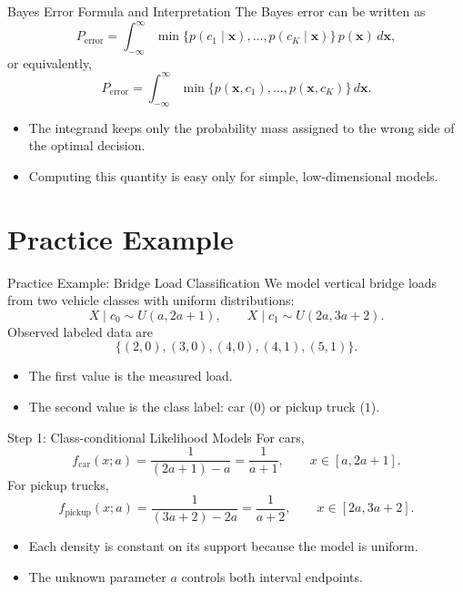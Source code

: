 \documentclass[10pt]{beamer}
\begin{document}
\begin{frame}{Bayes Error Formula and Interpretation}
  \justifying
  The Bayes error can be written as
  \[
    P_{\text{error}} = \int_{-\infty}^{\infty} \min\{p(c_1\mid\bm{x}),\ldots,p(c_K\mid\bm{x})\}\,p(\bm{x})\,d\bm{x},
  \]
  or equivalently,
  \[
    P_{\text{error}} = \int_{-\infty}^{\infty} \min\{p(\bm{x},c_1),\ldots,p(\bm{x},c_K)\}\,d\bm{x}.
  \]
  \begin{itemize}
    \item The integrand keeps only the probability mass assigned to the wrong side of the optimal decision.
    \item Computing this quantity is easy only for simple, low-dimensional models.
  \end{itemize}
\end{frame}

\section{Practice Example}

\begin{frame}{Practice Example: Bridge Load Classification}
  \justifying
  We model vertical bridge loads from two vehicle classes with uniform distributions:
  \[
    X\mid c_0 \sim U(a,2a+1),
    \qquad
    X\mid c_1 \sim U(2a,3a+2).
  \]
  Observed labeled data are
  \[
    \{(2,0),(3,0),(4,0),(4,1),(5,1)\}.
  \]
  \begin{itemize}
    \item The first value is the measured load.
    \item The second value is the class label: car ($0$) or pickup truck ($1$).
  \end{itemize}
\end{frame}

\begin{frame}{Step 1: Class-conditional Likelihood Models}
  \justifying
  For cars,
  \[
    f_{\text{car}}(x;a) = \frac{1}{(2a+1)-a} = \frac{1}{a+1},
    \qquad
    x \in [a,2a+1].
  \]
  For pickup trucks,
  \[
    f_{\text{pickup}}(x;a) = \frac{1}{(3a+2)-2a} = \frac{1}{a+2},
    \qquad
    x \in [2a,3a+2].
  \]
  \begin{itemize}
    \item Each density is constant on its support because the model is uniform.
    \item The unknown parameter $a$ controls both interval endpoints.
  \end{itemize}
\end{frame}
\end{document}
